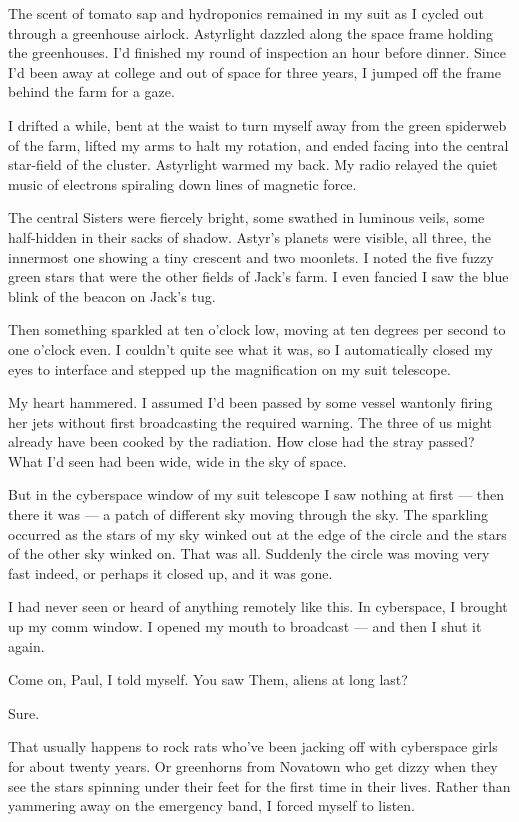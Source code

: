 \documentclass[english,11pt,letterpaper,onecolumn]{scrbook}
\begin{document}
	The scent of tomato sap and hydroponics remained in my suit as I cycled out through a greenhouse airlock.  Astyrlight dazzled along the space frame holding the greenhouses.  I'd finished my round of inspection an hour before dinner.  Since I'd been away at college and out of space for three years, I jumped off the frame behind the farm for a gaze.

	I drifted a while, bent at the waist to turn myself away from the green spiderweb of the farm, lifted my arms to halt my rotation, and ended facing into the central star-field of the cluster.  Astyrlight warmed my back.  My radio relayed the quiet music of electrons spiraling down lines of magnetic force.  

	The central Sisters were fiercely bright, some swathed in luminous veils, some half-hidden in their sacks of shadow.  Astyr's planets were visible, all three, the innermost one showing a tiny crescent and two moonlets.  I noted the five fuzzy green stars that were the other fields of Jack's farm.  I even fancied I saw the blue blink of the beacon on Jack's tug.

	Then something sparkled at ten o'clock low, moving at ten degrees per second to one o'clock even.  I couldn't quite see what it was, so I automatically closed my eyes to interface and stepped up the magnification on my suit telescope.

	My heart hammered.  I assumed I'd been passed by some vessel wantonly firing her jets without first broadcasting the required warning.  The three of us might already have been cooked by the radiation.  How close had the stray passed?  What I'd seen had been wide, wide in the sky of space.  

	But in the cyberspace window of my suit telescope I saw nothing at first --- then there it was --- a patch of different sky moving through the sky.  The sparkling occurred as the stars of my sky winked out at the edge of the circle and the stars of the other sky winked on.  That was all.  Suddenly the circle was moving very fast indeed, or perhaps it closed up, and it was gone.  

	I had never seen or heard of anything remotely like this.  In cyberspace, I brought up my comm window.  I opened my mouth to broadcast --- and then I shut it again.

	Come on, Paul, I told myself.  You saw Them, aliens at long last?  

	Sure.  

	That usually happens to rock rats who've been jacking off with cyberspace girls for about twenty years.  Or greenhorns from Novatown who get dizzy when they see the stars spinning under their feet for the first time in their lives.  Rather than yammering away on the emergency band, I forced myself to listen.  
\end{document}
